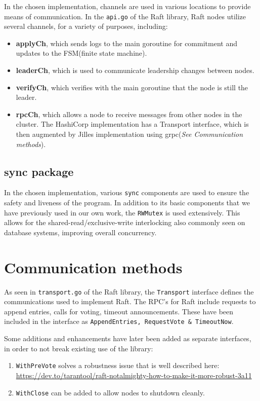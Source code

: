 \documentclass[a4paper,11pt]{article}
\begin{document}
In the chosen implementation, channels are used in various locations to provide means of communication. In the \texttt{api.go} of the Raft library, Raft nodes utilize several channels, for a variety of purposes, including:
\begin{itemize}
    \item \textbf{applyCh}, which sends logs to the main goroutine for commitment and updates to the FSM(finite state machine).
    \item \textbf{leaderCh}, which is used to communicate leadership changes between nodes.
    \item \textbf{verifyCh}, which verifies with the main goroutine that the node is still the leader.
    \item \textbf{rpcCh}, which allows a node to receive messages from other nodes in the cluster. The HashiCorp implementation has a Transport interface, which is then augmented by Jilles implementation using grpc(\textit{See Communication methods}).
\end{itemize}
\subsection{sync package} %
In the chosen implementation, various \texttt{sync} components are used to ensure the safety and liveness of the program. In addition to its basic components that we have previously used in our own work, the \texttt{RWMutex} is used extensively. This allows for the shared-read/exclusive-write interlocking also commonly seen on database systems, improving overall concurrency. 
\section{Communication methods}

As seen in \texttt{transport.go} of the Raft library, the \texttt{Transport} interface defines the communications used to implement Raft. The RPC's for Raft include requests to append entries, calls for voting, timeout announcements. These have been included in the interface as \texttt{AppendEntries, RequestVote \& TimeoutNow}. 


\bigbreak
\noindent Some additions and enhancements have later been added as separate interfaces, in order to not break existing use of the library:

\begin{enumerate}
    \item \texttt{WithPreVote} solves a robustness issue that is well described here: \url{https://dev.to/tarantool/raft-notalmighty-how-to-make-it-more-robust-3a11}
    \item \texttt{WithClose} can be added to allow nodes to shutdown cleanly.
\end{enumerate}
\end{document}
